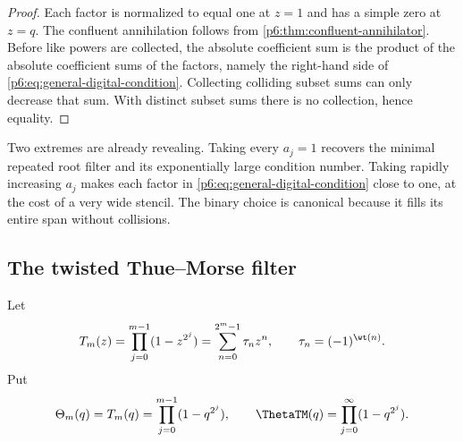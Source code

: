 \documentclass[11pt]{article}
\numberwithin{equation}{section}
\theoremstyle{definition}
\theoremstyle{remark}
\begin{document}
\begin{proof}
Each factor is normalized to equal one at $z=1$ and has a simple zero at $z=q$.
The confluent annihilation follows from \cref{p6:thm:confluent-annihilator}.  Before like
powers are collected, the absolute coefficient sum is the product of the absolute
coefficient sums of the factors, namely the right-hand side of
\eqref{p6:eq:general-digital-condition}.  Collecting colliding subset sums can only decrease
that sum.  With distinct subset sums there is no collection, hence equality.
\end{proof}

Two extremes are already revealing.  Taking every $a_j=1$ recovers the minimal repeated
root filter and its exponentially large condition number.  Taking rapidly increasing
$a_j$ makes each factor in \eqref{p6:eq:general-digital-condition} close to one, at the cost
of a very wide stencil.  The binary choice is canonical because it fills its entire span
without collisions.

\subsection{The twisted Thue--Morse filter}

Let
\begin{equation}
 T_m(z)=\prod_{j=0}^{m-1}(1-z^{2^j})
 =\sum_{n=0}^{2^m-1}\tau_nz^n,
 \qquad \tau_n=(-1)^{\wt(n)}.
 \label{p6:eq:tm-polynomial}
\end{equation}
Put
\begin{equation}
 \Theta_m(q)=T_m(q)=\prod_{j=0}^{m-1}(1-q^{2^j}),
 \qquad
 \ThetaTM(q)=\prod_{j=0}^{\infty}(1-q^{2^j}).
 \label{p6:eq:tm-theta}
\end{equation}
\end{document}
